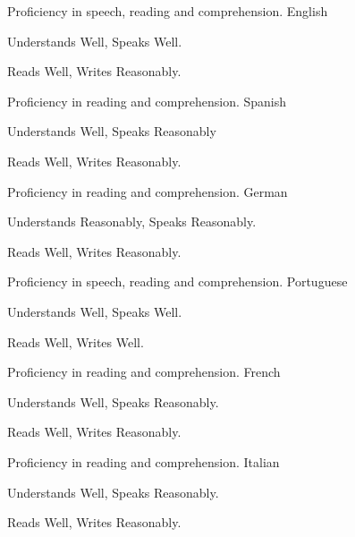 \noindent
\vspace{-0.3cm}
\begin{multicols}{2}
\begin{cventries}
\noindent

\cventry
        {Proficiency in speech, reading and comprehension.}
        {English}{}{}
        {
         \begin{cvitems}
           \item {Understands Well, Speaks Well.}
           \item {Reads Well, Writes Reasonably.}
          \end{cvitems}
        }

\cventry
        {Proficiency in reading and comprehension.}
        {Spanish}{}{}
        {
         \begin{cvitems}
           \item {Understands Well, Speaks Reasonably}
           \item {Reads Well, Writes Reasonably.}
          \end{cvitems}
        }

\cventry
        {Proficiency in reading and comprehension.}
        {German}{}{}
        {
         \begin{cvitems}
           \item {Understands Reasonably, Speaks Reasonably.}
           \item {Reads Well, Writes Reasonably.}
          \end{cvitems}
        }
\end{cventries}
\columnbreak
\begin{cventries}
\noindent

\cventry
      {Proficiency in speech, reading and comprehension.}
      {Portuguese}{}{}
      {
       \begin{cvitems}
         \item {Understands Well, Speaks Well.}
         \item {Reads Well, Writes Well.}
        \end{cvitems}
      }

\cventry
      {Proficiency in reading and comprehension.}
      {French}{}{}
      {
       \begin{cvitems}
         \item {Understands Well, Speaks Reasonably.}
         \item {Reads Well, Writes Reasonably.}
        \end{cvitems}
      }

\cventry
      {Proficiency in reading and comprehension.}
      {Italian}{}{}
      {
       \begin{cvitems}
         \item {Understands Well, Speaks Reasonably.}
         \item {Reads Well, Writes Reasonably.}
        \end{cvitems}
      }
\end{cventries}
\end{multicols}
